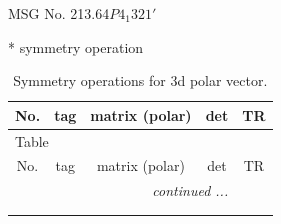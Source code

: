\documentclass[fleqn,8pt]{jsarticle}
\begin{document}
\setcounter{MaxMatrixCols}{32}

\renewcommand{\tablename}{Table~}
\renewcommand{\figurename}{Figure~}
\begin{center}
\LARGE
MSG No. 213.64\quad$P4_{1}321'$
\end{center}
* symmetry operation
\renewcommand{\arraystretch}{1.3}
\begin{longtable}{ccccc}
\caption{Symmetry operations for 3d polar vector.}
 \\
 \hline \hline
No. & tag & matrix (polar) & det & TR \\ \hline \endfirsthead

\multicolumn{4}{l}{\tablename\ \thetable{}} \\
 \hline \hline
No. & tag & matrix (polar) & det & TR \\ \hline \endhead

 \hline \hline
\multicolumn{4}{r}{\footnotesize\it continued ...} \\ \endfoot

 \hline \hline
\multicolumn{4}{r}{} \\ \endlastfoot


\end{longtable}
\end{document}
